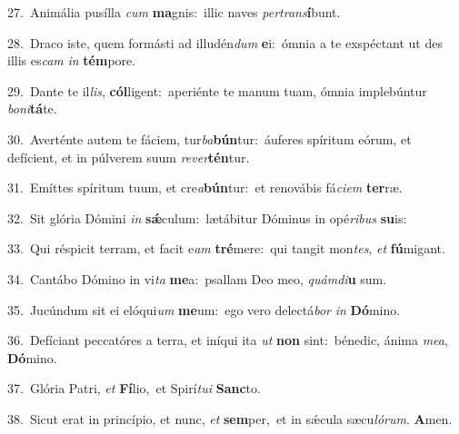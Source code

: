 {\numbfont\textcolor{\numbcolor}{27.}}~Animália pusílla \textit{cum} \textbf{ma}\-gnis:~\star illic naves \textit{per}\-\textit{trans}\textbf{í}bunt.\par
{\numbfont\textcolor{\numbcolor}{28.}}~Draco iste, quem formásti ad illudén\textit{dum} \textbf{e}\-i:~\star ómnia a te exspéctant ut des illis es\textit{cam} \textit{in} \textbf{tém}\-pore.\par
{\numbfont\textcolor{\numbcolor}{29.}}~Dante te il\-\textit{lis}\-, \textbf{cól}\-ligent:~\star aperiénte te manum tuam, ómnia implebúntur \textit{bo}\-\textit{ni}\textbf{tá}te.\par
{\numbfont\textcolor{\numbcolor}{30.}}~Averténte autem te fáciem, tur\-\textit{ba}\-\textbf{bún}tur:~\star áuferes spíritum eórum, et defícient, et in púlverem suum \textit{re}\-\textit{ver}\textbf{tén}tur.\par
{\numbfont\textcolor{\numbcolor}{31.}}~Emíttes spíritum tuum, et cre\-\textit{a}\-\textbf{bún}tur:~\star et renovábis fá\-\textit{ci}\-\textit{em} \textbf{ter}\-ræ.\par
{\numbfont\textcolor{\numbcolor}{32.}}~Sit glória Dómini \textit{in} \textbf{sǽ}\-culum:~\star lætábitur Dóminus in opé\-\textit{ri}\-\textit{bus} \textbf{su}\-is:\par
{\numbfont\textcolor{\numbcolor}{33.}}~Qui réspicit terram, et facit e\textit{am} \textbf{tré}\-mere:~\star qui tangit mon\-\textit{tes}\-, \textit{et} \textbf{fú}\-migant.\par
{\numbfont\textcolor{\numbcolor}{34.}}~Cantábo Dómino in vi\textit{ta} \textbf{me}\-a:~\star psallam Deo meo, \textit{quám}\-\textit{di}\textbf{u} sum.\par
{\numbfont\textcolor{\numbcolor}{35.}}~Jucúndum sit ei elóqui\textit{um} \textbf{me}\-um:~\star ego vero delectá\textit{bor} \textit{in} \textbf{Dó}\-mino.\par
{\numbfont\textcolor{\numbcolor}{36.}}~Defíciant peccatóres a terra, et iníqui ita \textit{ut} \textbf{non} sint:~\star bénedic, ánima \textit{me}\-\textit{a}, \textbf{Dó}\-mino.\par
{\numbfont\textcolor{\numbcolor}{37.}}~Glória Patri, \textit{et} \textbf{Fí}\-lio,~\star et Spirí\-\textit{tu}\-\textit{i} \textbf{Sanc}\-to.\par
{\numbfont\textcolor{\numbcolor}{38.}}~Sicut erat in princípio, et nunc, \textit{et} \textbf{sem}\-per,~\star et in sǽcula sæcu\-\textit{ló}\-\textit{rum}. \textbf{A}\-men.\par
